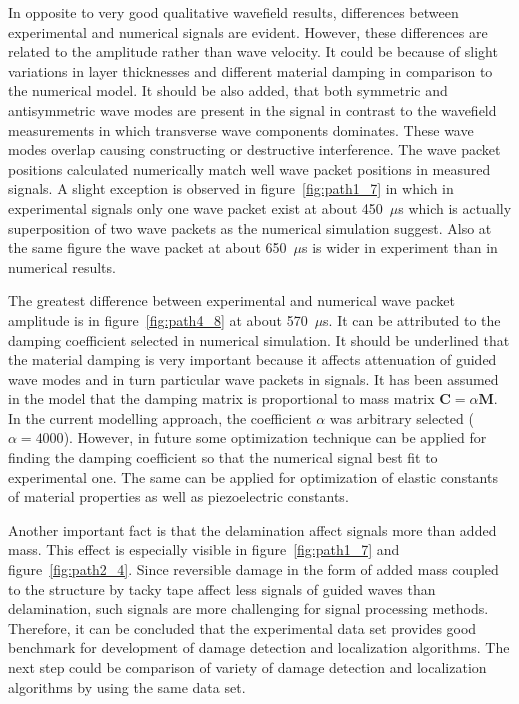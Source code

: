 \documentclass[12pt]{iopart}
\newcommand{\bm}[1]{\mathbf{#1}}
\begin{document}
In opposite to very good qualitative wavefield results, differences between experimental and numerical signals are evident. However, these differences are related to the amplitude rather than wave velocity. It could be because of slight variations in layer thicknesses and different material damping in comparison to the numerical model. It should be also added, that both symmetric and antisymmetric wave modes are present in the signal in contrast to the wavefield measurements in which transverse wave components dominates. These wave modes overlap causing constructing or destructive interference. The wave packet positions calculated numerically match well wave packet positions in measured signals. A slight exception is observed in figure~\ref{fig:path1_7} in which in experimental signals only one wave packet exist at about 450~\(\mu\)s which is actually superposition of two wave packets as the numerical simulation suggest. Also at the same figure the wave packet at about 650~\(\mu\)s is wider in experiment than in numerical results. 

The greatest difference between experimental and numerical wave packet amplitude is in figure~\ref{fig:path4_8} at about 570~\(\mu\)s. It can be attributed to the damping coefficient selected in numerical simulation. It should be underlined that the material damping is very important because it affects attenuation of guided wave modes and in turn particular wave packets in signals. It has been assumed in the model that the damping matrix is proportional to mass matrix \(\bm{C} = \alpha \bm{M}\). In the current modelling approach, the coefficient \(\alpha\) was arbitrary selected (\(\alpha = 4000\)). However, in future some optimization technique can be applied for finding the damping coefficient so that the numerical signal best fit to experimental one. The same can be applied for optimization of elastic constants of material properties as well as piezoelectric constants. 

Another important fact is that the delamination affect signals more than added mass. This effect is especially visible in figure~\ref{fig:path1_7} and figure~\ref{fig:path2_4}. Since reversible damage in the form of added mass coupled to the structure by tacky tape affect less signals of guided waves than delamination, such signals are more challenging for signal processing methods. Therefore, it can be concluded that the experimental data set provides good benchmark for development of damage detection and localization algorithms. The next step could be comparison of variety of damage detection and localization algorithms by using the same data set.
\end{document}
